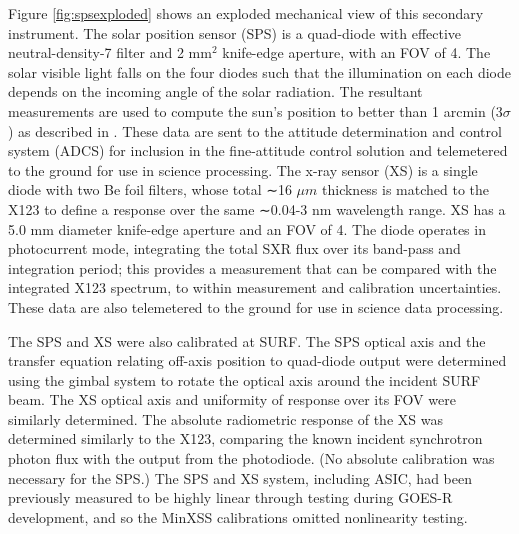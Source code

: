 Figure \ref{fig:spsexploded} shows an exploded mechanical view of this secondary instrument. The solar position sensor (SPS) is a quad-diode with effective neutral-density-7 filter and 2 mm$^2$ knife-edge aperture, with an FOV of 4\degree. The solar visible light falls on the four diodes such that the illumination on each diode depends on the incoming angle of the solar radiation. The resultant measurements are used to compute the sun's position to better than 1 arcmin ($3\sigma$) as described in \citet{Chamberlin2009}. These data are sent to the attitude determination and control system (ADCS) for inclusion in the fine-attitude control solution and telemetered to the ground for use in science processing. The x-ray sensor (XS) is a single diode with two Be foil filters, whose total ∼16 $\mu m$ thickness is matched to the X123 to define a response over the same ∼0.04-3 nm wavelength range. XS has a 5.0 mm diameter knife-edge aperture and an FOV of 4\degree. The diode operates in photocurrent mode, integrating the total SXR flux over its band-pass and integration period; this provides a measurement that can be compared with the integrated X123 spectrum, to within measurement and calibration uncertainties. These data are also telemetered to the ground for use in science data processing.

The SPS and XS were also calibrated at SURF. The SPS optical axis and the transfer equation relating off-axis position to quad-diode output were determined using the gimbal system to rotate the optical axis around the incident SURF beam. The XS optical axis and uniformity of response over its FOV were similarly determined. The absolute radiometric response of the XS was determined similarly to the X123, comparing the known incident synchrotron photon flux with the output from the photodiode. (No absolute calibration was necessary for the SPS.) The SPS and XS system, including ASIC, had been previously measured to be highly linear through testing during GOES-R development, and so the MinXSS calibrations omitted nonlinearity testing.

